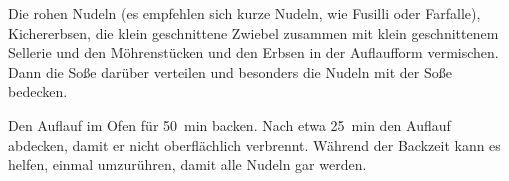 \begin{recipeDP}
{        \step Die rohen Nudeln (es empfehlen sich kurze Nudeln, wie Fusilli oder Farfalle), Kichererbsen, die klein geschnittene Zwiebel zusammen mit klein geschnittenem Sellerie und den Möhrenstücken und den Erbsen in der Auflaufform vermischen. Dann die Soße darüber verteilen und besonders die Nudeln mit der Soße bedecken.

        \step Den Auflauf im Ofen für \SI{50}{\minute} backen. Nach etwa \SI{25}{\minute} den Auflauf abdecken, damit er nicht oberflächlich verbrennt. Während der Backzeit kann es helfen, einmal umzurühren, damit alle Nudeln gar werden.
    }



\end{recipeDP}
